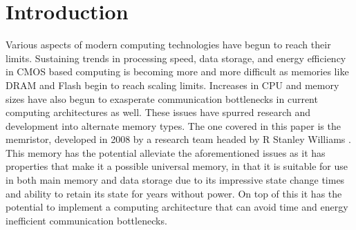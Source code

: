 \documentclass{sig-alternate}
\begin{document}
\section{Introduction}
\label{sec:introduction}
Various aspects of modern computing technologies have begun to reach their limits.  Sustaining trends in processing speed, data storage, and energy efficiency in CMOS based computing is becoming more and more difficult as memories like DRAM and Flash begin to reach scaling limits.  Increases in CPU and memory sizes have also begun to exasperate communication bottlenecks in current computing architectures as well.  These issues have spurred research and development into alternate memory types.  The one covered in this paper is the memristor, developed in 2008 by a research team headed by R Stanley Williams \cite{MemFound}.  This memory has the potential alleviate the aforementioned issues as it has properties that make it a possible universal memory, in that it is suitable for use in both main memory and data storage due to its impressive state change times and ability to retain its state for years without power.  On top of this it has the potential to implement a computing architecture that can avoid time and energy inefficient communication bottlenecks.
\end{document}
